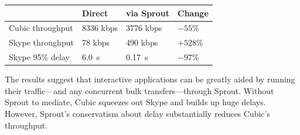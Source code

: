 \begin{center}
{
\small
\noindent \begin{tabular}{|l|l|l|l|}
\hline
& Direct & via Sprout & Change \\
\hline
\hline
Cubic throughput & 8336 kbps & 3776 kbps & \cellcolor{red!20}$-55\%$ \\
Skype throughput & 78 kbps & 490 kbps & \cellcolor{blue!20}$+528\%$ \\
Skype 95\% delay & 6.0~s & 0.17~s & \cellcolor{blue!20}$-97\%$ \\
\hline
\end{tabular}
}
\end{center}

The results suggest that interactive applications can be greatly aided
by running their traffic---and any concurrent bulk transfers---through
Sprout. Without Sprout to mediate, Cubic squeezes out Skype and builds
up huge delays. However, Sprout's conservatism about delay
substantially reduces Cubic's throughput.

\vspace{\baselineskip}








